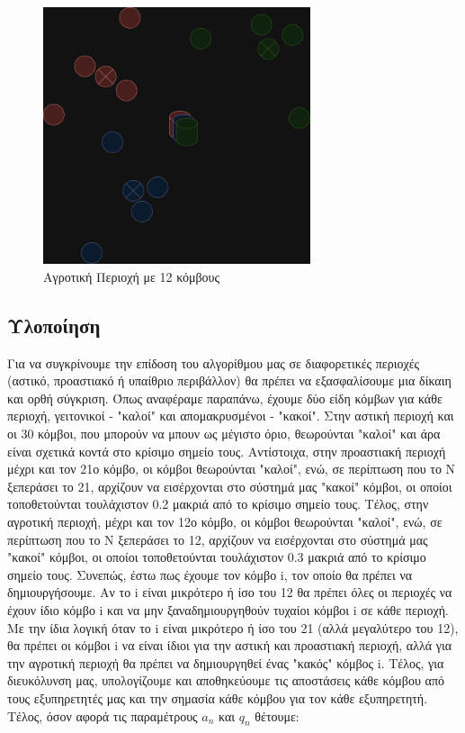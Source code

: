 \begin{figure}[H]
    \centering
    \includegraphics[width=0.7\textwidth]{figures/chapter2/rural.drawio.png}
    \caption{Αγροτική Περιοχή με 12 κόμβους}
    \label{fig49}
\end{figure}

\subsection{Υλοποίηση}

Για να συγκρίνουμε την επίδοση του αλγορίθμου μας σε διαφορετικές περιοχές (αστικό, προαστιακό ή υπαίθριο περιβάλλον) θα πρέπει να εξασφαλίσουμε μια δίκαιη και ορθή σύγκριση. Όπως αναφέραμε παραπάνω, έχουμε δύο είδη κόμβων για κάθε περιοχή, γειτονικοί - "καλοί" και απομακρυσμένοι - "κακοί". Στην αστική περιοχή και οι 30 κόμβοι, που μπορούν να μπουν ως μέγιστο όριο, θεωρούνται "καλοί" και άρα είναι σχετικά κοντά στο κρίσιμο σημείο τους. Αντίστοιχα, στην προαστιακή περιοχή μέχρι και τον 21ο κόμβο, οι κόμβοι θεωρούνται "καλοί", ενώ, σε περίπτωση που το Ν ξεπεράσει το 21, αρχίζουν να εισέρχονται στο σύστημά μας "κακοί" κόμβοι, οι οποίοι τοποθετούνται τουλάχιστον 0.2 μακριά από το κρίσιμο σημείο τους. Τέλος, στην αγροτική περιοχή, μέχρι και τον 12ο κόμβο, οι κόμβοι θεωρούνται "καλοί", ενώ, σε περίπτωση που το Ν ξεπεράσει το 12, αρχίζουν να εισέρχονται στο σύστημά μας "κακοί" κόμβοι, οι οποίοι τοποθετούνται τουλάχιστον 0.3 μακριά από το κρίσιμο σημείο τους. Συνεπώς, έστω πως έχουμε τον κόμβο i, τον οποίο θα πρέπει να δημιουργήσουμε. Αν το i είναι μικρότερο ή ίσο του 12 θα πρέπει όλες οι περιοχές να έχουν ίδιο κόμβο i και να μην ξαναδημιουργηθούν τυχαίοι κόμβοι i σε κάθε περιοχή. Με την ίδια λογική όταν το i είναι μικρότερο ή ίσο του 21 (αλλά μεγαλύτερο του 12), θα πρέπει οι κόμβοι i να είναι ίδιοι για την αστική και προαστιακή περιοχή, αλλά για την αγροτική περιοχή θα πρέπει να δημιουργηθεί ένας "κακός" κόμβος i. Τέλος, για διευκόλυνση μας, υπολογίζουμε και αποθηκεύουμε τις αποστάσεις κάθε κόμβου από τους εξυπηρετητές μας και την σημασία κάθε κόμβου για τον κάθε εξυπηρετητή. Τέλος, όσον αφορά τις παραμέτρους $a_n$ και $q_n$ θέτουμε:

